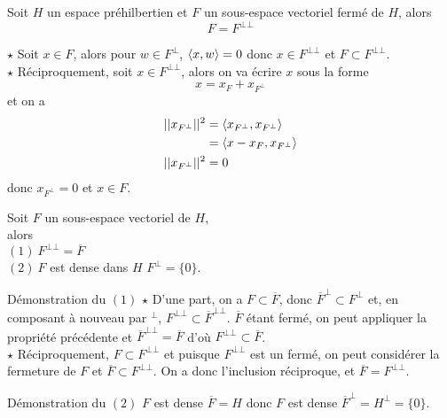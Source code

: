 \documentclass[a4paper,11pt, twoside]{article}
\begin{document}
\begin{prop}
  Soit $H$ un espace préhilbertien et $F$ un sous-espace vectoriel fermé de $H$, alors\\
  
  $$F=F^{\bot\bot}$$
\end{prop}


\begin{Proof}
  $\star$ Soit $x\in F$, alors pour $w\in F^\bot$, $\left\langle x,w \right\rangle=0$ donc $x\in F^{\bot\bot}$ et $F\subset F^{\bot\bot}$.\\

  $\star$ Réciproquement, soit $x\in F^{\bot\bot}$, alors on va écrire $x$ sous la forme 
  $$x=x_F+x_{F^\bot}$$
  et on a 
  \begin{align*}
    ||x_{F^\bot}||^2&=\left\langle x_{F^\bot},x_{F^\bot} \right\rangle\\
    &=\left\langle x-x_F,x_{F^\bot} \right\rangle\\
    ||x_{F^\bot}||^2&=0
  \end{align*}
  donc $x_{F^\bot}=0$ et $x\in F$.
\end{Proof}


\begin{prop}
  Soit $F$ un sous-espace vectoriel de $H$, \\

  alors\\
  $(\mathit 1)\ F^{\bot\bot}=\overline{F}$\\
  $(\mathit 2)\ F$ est dense dans $H$ \ssi $F^\bot=\{0\}.$
\end{prop}


\begin{ProofC}{Démonstration du $(\mathit 1)$}
  $\star$ D'une part, on a $F\subset \overline{F}$, donc $\overline{F}^\bot\subset F^\bot$ et, en composant à nouveau par $^\bot$, $F^{\bot\bot}\subset \overline{F}^{\bot\bot}$. $\overline{F}$ étant fermé, on peut appliquer la propriété précédente et $\overline{F}^{\bot\bot}=\overline{F}$ d'où $F^{\bot\bot}\subset\overline{F}$.\\

  $\star$ Réciproquement, $F\subset F^{\bot\bot}$ et puisque $F^{\bot\bot}$ est un fermé, on peut considérer la fermeture de $F$ et $\overline{F}\subset F^{\bot\bot}$. On a donc l'inclusion réciproque, et $\overline{F}= F^{\bot\bot}$.
\end{ProofC}



\begin{ProofC}{Démonstration du $(\mathit 2)$}
  $F$ est dense \ssi $\overline{F}=H$ donc $F$ est dense \ssi $\overline{F}^\bot=H^\bot=\{0\}.$
\end{ProofC}
\end{document}
